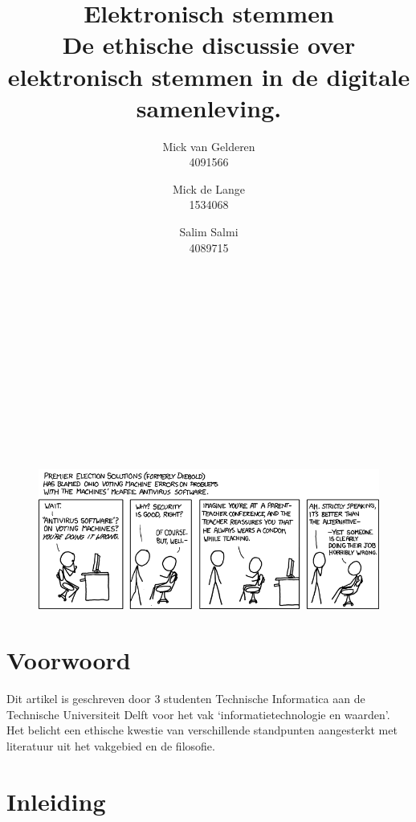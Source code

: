 \documentclass[a4paper]{article}
\title{Elektronisch stemmen \\ \large De ethische discussie over elektronisch stemmen in de digitale samenleving.}
\author{
	Mick van Gelderen \\ 4091566 \and 
	Mick de Lange \\ 1534068 \and
	Salim Salmi \\ 4089715
}
\begin{document}
\maketitle

\hfill \\ \\ \\ \\ \\ \\ \\ \\ \\ \\
\begin{figure}[htp]
	\centering
	\includegraphics[width=\textwidth]{media/voting_machines.png}
	\label{fig:voting-machines}

\end{figure}

\thispagestyle{empty}
\setcounter{page}{0}
\newpage

\section*{Voorwoord}
Dit artikel is geschreven door 3 studenten Technische Informatica aan de Technische Universiteit Delft voor het vak `informatietechnologie en waarden'.
Het belicht een ethische kwestie van verschillende standpunten aangesterkt met literatuur uit het vakgebied en de filosofie. 

\thispagestyle{empty}

\begingroup
\hypersetup{linkcolor=black}
\tableofcontents
\endgroup

\thispagestyle{empty}
\newpage

\section{Inleiding}
\end{document}
